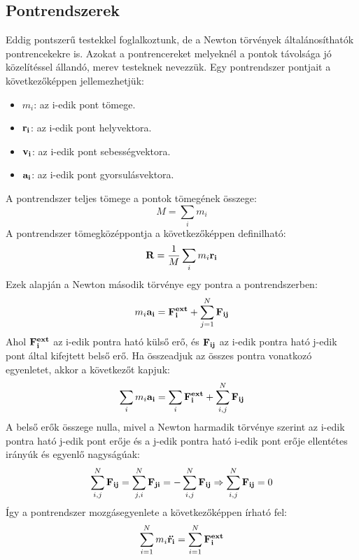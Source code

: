\documentclass[a4paper,12pt]{article}
\begin{document}
\subsection{Pontrendszerek}
Eddig pontszerű testekkel foglalkoztunk, de a Newton törvények általánosíthatók pontrencekekre is. Azokat a pontrencereket melyeknél a pontok távolsága jó közelítéssel állandó, merev testeknek nevezzük.
Egy pontrendszer pontjait a következőképpen jellemezhetjük:
\begin{itemize}
    \item $m_i$: az i-edik pont tömege.
    \item $\bold{r_i}$: az i-edik pont helyvektora.
    \item $\bold{v_i}$: az i-edik pont sebességvektora.
    \item $\bold{a_i}$: az i-edik pont gyorsulásvektora.
\end{itemize}
A pontrendszer teljes tömege a pontok tömegének összege:
\begin{equation}
    M = \sum_{i} m_i
\end{equation}
A pontrendszer tömegközéppontja a következőképpen definilható:
\begin{equation}
    \bold{R} = \frac{1}{M} \sum_{i} m_i \bold{r_i}
\end{equation}
Ezek alapján a Newton második törvénye egy pontra a pontrendszerben:
\begin{equation}
    m_i \bold{a_i} = \bold{F_i^{ext}} + \sum_{j=1}^{N} \bold{F_{ij}}
\end{equation}
Ahol $\bold{F_i^{ext}}$ az i-edik pontra ható külső erő, és $\bold{F_{ij}}$ az i-edik pontra ható j-edik pont által kifejtett belső erő. Ha összeadjuk az összes pontra vonatkozó egyenletet, akkor a következőt kapjuk:
\begin{equation}
    \sum_{i} m_i \bold{a_i} = \sum_{i} \bold{F_i^{ext}} + \sum_{i,j}^{N} \bold{F_{ij}}
\end{equation}
A belső erők összege nulla, mivel a Newton harmadik törvénye szerint az i-edik pontra ható j-edik pont erője és a j-edik pontra ható i-edik pont erője ellentétes irányúk és egyenlő nagyságúak:
\begin{equation}
    \sum_{i,j}^{N} \bold{F_{ij}} = \sum_{j,i}^{N} \bold{F_{ji}} = -\sum_{i,j}^{N} \bold{F_{ij}} \Rightarrow \sum_{i,j}^{N} \bold{F_{ij}} = 0
\end{equation}
Így a pontrendszer mozgásegyenlete a következőképpen írható fel:
\begin{equation}
    \sum_{i=1}^{N} m_i \bold{\ddot{r_i}} = \sum_{i=1}^{N} \bold{F_i^{ext}}
\end{equation}
\end{document}

